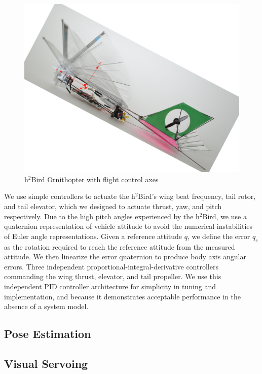 \documentclass[letterpaper, 10 pt, conference]{ieeeconf}
\begin{document}
\begin{figure}[tb]
\centering
\includegraphics[width=\linewidth]{figures/h2bird_axes.jpg}
\caption{h$^2$Bird Ornithopter with flight control axes}
\label{fig:H2Bird}
\end{figure}

We use simple controllers to actuate the h$^2$Bird's wing beat frequency, tail rotor, and tail elevator, which we designed to actuate thrust, yaw, and pitch respectively. Due to the high pitch angles experienced by the h$^2$Bird, we use a quaternion representation of vehicle attitude to avoid the numerical instabilities of Euler angle representations. Given a reference attitude $q$, we define the error $q_e$ as the rotation required to reach the reference attitude from the measured attitude. We then linearize the error quaternion to produce body axis angular errors. Three independent proportional-integral-derivative controllers commanding the wing thrust, elevator, and tail propeller. We use this independent PID controller architecture for simplicity in tuning and implementation, and because it demonstrates acceptable performance in the absence of a system model.

\subsection{Pose Estimation}

\subsection{Visual Servoing}
\end{document}
